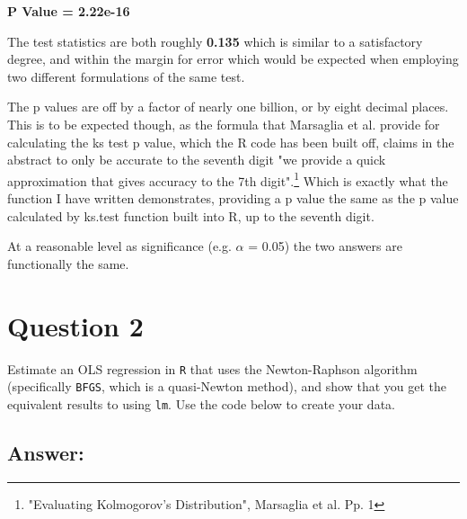 \documentclass[12pt,letterpaper]{article}
\begin{document}
   \textbf{P Value = 2.22e-16}
   
   \vspace{1cm}
   
   The test statistics are both roughly \textbf{0.135} which is similar to a satisfactory degree, and within the margin for error which would be expected when employing two different formulations of the same test.
   
   \vspace{1cm}
   
   The p values are off by a factor of nearly one billion, or by eight decimal places. This is to be expected though, as the formula that Marsaglia et al. provide for calculating the ks test p value, which the R code has been built off, claims in the abstract to only be accurate to the seventh digit "we provide a quick approximation that gives accuracy to the 7th digit".\footnote{"Evaluating Kolmogorov’s Distribution", Marsaglia et al. Pp. 1} Which is exactly what the function I have written demonstrates, providing a p value the same as the p value calculated by ks.test function built into R, up to the seventh digit.
   
   \vspace{1cm}
   
   At a reasonable level as significance (e.g. $\alpha$ = 0.05) the two answers are functionally the same.

\section*{Question 2}
\noindent Estimate an OLS regression in \texttt{R} that uses the Newton-Raphson algorithm (specifically \texttt{BFGS}, which is a quasi-Newton method), and show that you get the equivalent results to using \texttt{lm}. Use the code below to create your data.
\vspace{.5cm}


\vspace{3cm}

\subsection*{Answer:}
\end{document}
